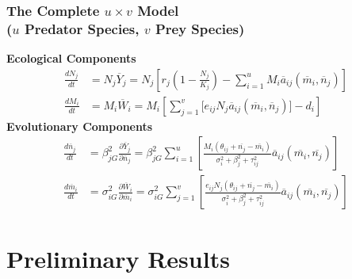 \documentclass[10pt]{beamer}
\begin{document}
\begin{frame}
	\frametitle{The Complete $u\times v$ Model \\ ($u$ Predator Species, $v$ Prey Species)}
	{\bf Ecological Components}
	\begin{align*}
		\frac{dN_j}{dt} &= N_j\overline{Y}_j = N_j \left[r_j\left(1 - \frac{N_j}{K_j}\right) - \sum\limits_{i = 1}^{u}M_i\overline{a}_{ij}(\overline{m}_i, \overline{n}_j)\right] \\[.1cm]
		\frac{dM_i}{dt} &= M_i\overline{W}_i = M_i \left[\sum\limits_{j = 1}^{v}\Big[e_{ij}N_j\overline{a}_{ij}(\overline{m}_i, \overline{n}_j)\Big] - d_i\right]
	\end{align*}
	{\bf Evolutionary Components}
	\begin{align*}
	\frac{d\overline{n}_j}{dt} &= \beta_{jG}^2\frac{\partial \overline{Y}_j}{\partial \overline{n}_j} = \beta_{jG}^2\sum\limits_{i=1}^{u}\left[\frac{M_i(\theta_{ij} + \overline{n_j} - \overline{m_i})}{\sigma_i^2 + \beta_j^2 + \tau_{ij}^2} \overline{a}_{ij}(\overline{m_i}, \overline{n_j})\right]\\[.1cm]
	\frac{d\overline{m}_i}{dt} &= \sigma_{iG}^2\frac{\partial \overline{W}_i}{\partial \overline{m}_i} = \sigma_{iG}^2\sum\limits_{j=1}^{v}\left[\frac{e_{ij}N_j(\theta_{ij} + \overline{n_j} - \overline{m_i})}{\sigma_i^2 + \beta_j^2 + \tau_{ij}^2} \overline{a}_{ij}(\overline{m_i}, \overline{n_j})\right]
	\end{align*}
\end{frame}

\section{Preliminary Results}
\end{document}
